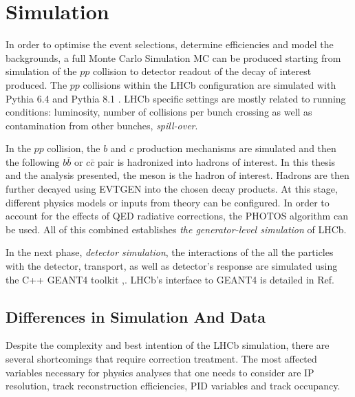 \section{Simulation }
\label{simulationchap}
In order to optimise the event selections, determine efficiencies and model the backgrounds, a full Monte Carlo Simulation \Gls{MC} can be produced starting from simulation of the $pp$ collision to detector readout of the decay of interest produced. 
The $pp$ collisions within the \Gls{LHCb} configuration \cite{Belyaev:2011zza} are simulated with Pythia 6.4 \cite{pythia6} and Pythia 8.1 \cite{pythia8}. \Gls{LHCb} specific settings are mostly related to running conditions: luminosity, number of collisions per bunch crossing as well as contamination from other bunches, \textit{spill-over}. 

In the $pp$ collision, the $b$ and $c$ production mechanisms are simulated and then the following $b\bar{b}$ or $c\bar{c}$ pair is hadronized into hadrons of interest. In this thesis and the analysis presented, the \Bp meson is the hadron of interest. Hadrons are then further decayed using EVTGEN \cite{Lange:2001uf} into the chosen decay products. At this stage, different physics models or inputs from theory can be configured. %
In order to account for the effects of \Gls{QED} radiative corrections, the PHOTOS \cite{photos} algorithm can be used. All of this combined establishes \textit{the generator-level simulation} of LHCb.


In the next phase, \textit{detector simulation}, the interactions of the all the particles with the detector, transport, as well as detector's response are simulated using the C++ GEANT4 toolkit \cite{Geant4},\cite{Agostinelli:2002hh}. \Gls{LHCb}'s interface to GEANT4 is detailed in Ref\cite{Clemencic:2011zza}. 

\subsection{Differences in Simulation And Data }
\label{detpid}
Despite the complexity and best intention of the \Gls{LHCb} simulation, there are several shortcomings that require correction treatment.
The most affected variables necessary for physics analyses that one needs to consider are \Gls{IP} resolution, track reconstruction efficiencies, \Gls{PID} variables and track occupancy.

